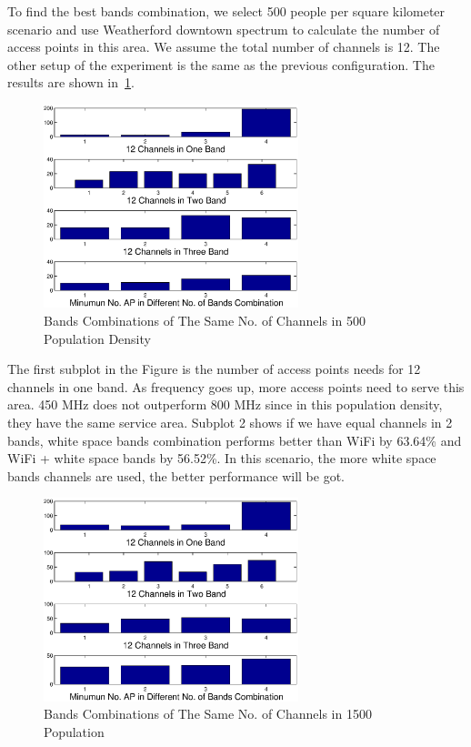 To find the best bands combination, we select 500 people per square kilometer scenario and use Weatherford 
downtown spectrum to calculate the number of access points in this area. We assume the total number of channels 
is 12. The other setup of the experiment is 
the same as the previous configuration. The results are shown in~\ref{fig:varybandcomb}.
   \begin{figure}
   \centering
   \includegraphics[width=74mm]{figures/varybandcomb}
   \vspace{-0.1in}
   \caption{Bands Combinations of The Same No. of Channels in 500 Population Density}                                                                 
   \label{fig:varybandcomb}
   \end{figure}

The first subplot in the Figure is the number of access points needs for 12 channels in one band.
As frequency goes up, more access points need to serve this area. 450 MHz does not outperform 
800 MHz since in this population density, they have the same service area.
Subplot 2 shows if we have equal channels in 2 bands, white space bands combination performs better
than WiFi by 63.64\% and WiFi + white space bands by 56.52\%. In this scenario, the more white space bands channels are 
used, the better performance will be got.

   \begin{figure}
   \centering
   \includegraphics[width=74mm]{figures/varybandcomb2}
   \vspace{-0.1in}
   \caption{Bands Combinations of The Same No. of Channels in 1500 Population}                                                                 
   \label{fig:varybandcomb2}
   \end{figure}

